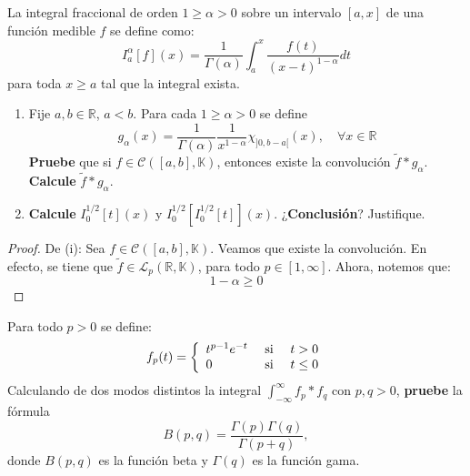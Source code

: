 \documentclass[12pt]{report}
\theoremstyle{largebreak}
\begin{document}
    \begin{excer}
        La integral fraccional de orden $1\geq\alpha>0$ sobre un intervalo $[a,x]$ de una función medible $f$ se define como:
        \begin{equation*}
            I_a^\alpha[f](x)=\frac{1}{\Gamma(\alpha)}\int_a^x\frac{f(t)}{(x-t)^{1-\alpha}}dt
        \end{equation*}
        para toda $x\geq a$ tal que la integral exista.
        \begin{enumerate}
            \item Fije $a,b\in\mathbb{R}$, $a<b$. Para cada $1\geq\alpha>0$ se define
            \begin{equation*}
                g_\alpha(x)=\frac{1}{\Gamma(\alpha)}\frac{1}{x^{1-\alpha}}\chi_{]0,b-a[}(x),\quad\forall x\in\mathbb{R}
            \end{equation*}
            \textbf{Pruebe} que si $f\in\mathcal{C}([a,b],\mathbb{K})$, entonces existe la convolución $\widetilde{f}*g_\alpha$. \textbf{Calcule} $\widetilde{f}*g_\alpha$.

            \item \textbf{Calcule} $I_0^{1/2}[t](x)$ y $I_0^{1/2}[I_0^{1/2}[t]](x)$. ¿\textbf{Conclusión}? Justifique.
        \end{enumerate}
    \end{excer}

    \begin{proof}
        De (i): Sea $f\in\mathcal{C}([a,b],\mathbb{K})$. Veamos que existe la convolución. En efecto, se tiene que $\widetilde{f}\in\mathcal{L}_p(\mathbb{R},\mathbb{K})$, para todo $p\in[1,\infty]$. Ahora, notemos que:
        \begin{equation*}
            1-\alpha\geq0
        \end{equation*}
    \end{proof}

    \begin{excer}
        Para todo $p>0$ se define:
        \begin{equation*}
            f_p(t)=\left\{\begin{array}{lcr}
                t^{p-1}e^{-t} & \textup{ si }& t>0\\
                0 & \textup{ si } & t\leq 0\\
            \end{array}
            \right.
        \end{equation*}
        Calculando de dos modos distintos la integral $\int_{-\infty}^\infty f_p*f_q$ con $p,q>0$, \textbf{pruebe} la fórmula
        \begin{equation*}
            B(p,q)=\frac{\Gamma(p)\Gamma(q)}{\Gamma(p+q)},
        \end{equation*}
        donde $B(p,q)$ es la función beta y $\Gamma(q)$ es la función gama.
    \end{excer}
    
\end{document}
